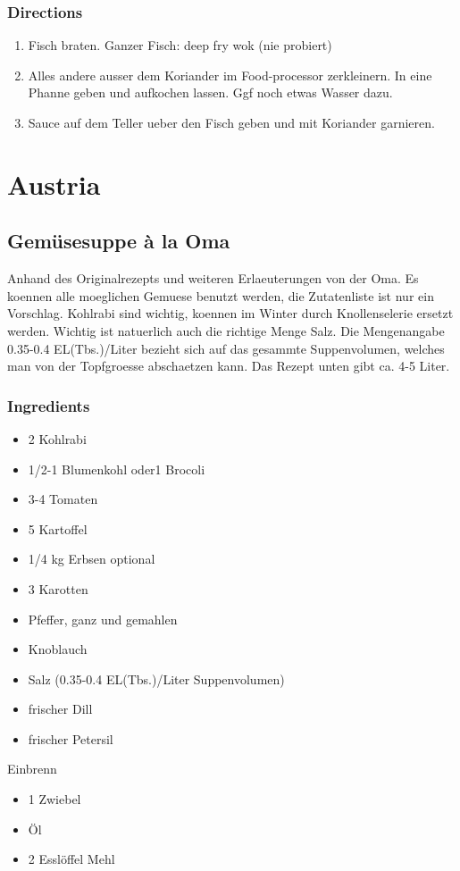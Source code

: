 \subsubsection*{Directions}
\begin{enumerate}
\item Fisch braten. Ganzer Fisch: deep fry wok (nie probiert)
\item Alles andere ausser dem Koriander im Food-processor zerkleinern. In eine Phanne geben und aufkochen lassen. Ggf noch etwas Wasser dazu.
\item Sauce auf dem Teller ueber den Fisch geben und mit Koriander garnieren.
\end{enumerate}
\pagebreak


\section{Austria}

\subsection{Gemüsesuppe à la Oma}
Anhand des Originalrezepts und weiteren Erlaeuterungen von der Oma. Es koennen alle moeglichen Gemuese benutzt werden, die Zutatenliste ist nur ein Vorschlag. Kohlrabi sind wichtig, koennen im Winter durch Knollenselerie ersetzt werden. Wichtig ist natuerlich auch die richtige Menge Salz. Die Mengenangabe 0.35-0.4 EL(Tbs.)/Liter bezieht sich auf das gesammte Suppenvolumen, welches man von der Topfgroesse abschaetzen kann. Das Rezept unten gibt ca. 4-5 Liter.
\subsubsection*{Ingredients}
\begin{itemize}
\item[] 2 Kohlrabi
\item[] 1/2-1 Blumenkohl oder1 Brocoli
\item[] 3-4 Tomaten
\item[] 5 Kartoffel
\item[] 1/4 kg Erbsen optional
\item[] 3 Karotten
\item[] Pfeffer, ganz und gemahlen
\item[] Knoblauch
\item[] Salz (0.35-0.4 EL(Tbs.)/Liter Suppenvolumen)
\item[] frischer Dill
\item[] frischer Petersil
\end{itemize}
Einbrenn
\begin{itemize}
\item[] 1 Zwiebel
\item[] Öl
\item[] 2 Esslöffel Mehl
\end{itemize}
